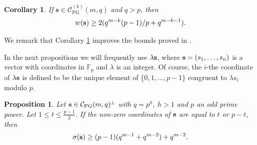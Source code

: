 \documentclass[12pt]{article}
\newcommand{\cC}{{\mathcal C}}
\newcommand{\F}{{\mathbb F}}
\newtheorem{corollary}[theorem]{Corollary}
\newtheorem{proposition}[theorem]{Proposition}
\DeclareMathOperator{\PG}{{PG}}
\begin{document}
	\begin{corollary}
		\label{improvesM}
		If $\boldsymbol{s} \in \cC^{(k)}_{\PG}(m,q)$ and $q >p$, then 
		\[ w({\bf s}) \geq 2(q^{m-k}(p-1)/p+q^{m-k-1}).\]  
	\end{corollary}
	We remark that Corollary \ref{improvesM} improves the bounds proved in  \cite[Theorems 14 and 15]{LaStoVan}.
	
	\medskip
	
	In the next propositions we will frequently use $\lambda {\bf s}$, where ${\bf s}=(s_1,\ldots,s_n)$ is a vector with coordinates in $\F_p$ and $\lambda$ is an integer. Of course, the $i$-the coordinate of $\lambda {\bf s}$ is defined to be the unique element of $\{0,1,\ldots,p-1\}$ congruent to $\lambda s_i$ modulo $p$.
	
	\begin{proposition}\label{t/p-t}
		Let ${\bf s} \in \cC_{\PG}(m,q)^\perp$ with $q=p^h$, $h>1$ and $p$ an odd prime power. Let $1 \leq t \leq  \frac{p-1}{2}$. If the non-zero coordinates of $\bf s$ are equal to $t$ or $p-t$, then
		\begin{equation*}
			\sigma({\bf s})\geq (p-1)(q^{m-1}+q^{m-2})+q^{m-2}.
		\end{equation*}
	\end{proposition}
\end{document}

